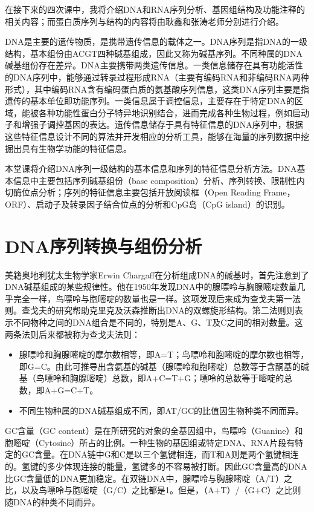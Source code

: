 在接下来的四次课中，我将介绍DNA和RNA序列分析、基因组结构及功能注释的相关内容；而蛋白质序列与结构的内容将由耿鑫和张涛老师分别进行介绍。

DNA是主要的遗传物质，是携带遗传信息的载体之一。DNA序列是指DNA的一级结构，基本组份由ACGT四种碱基组成，因此又称为碱基序列。不同种属的DNA碱基组份存在差异。DNA主要携带两类遗传信息。一类信息储存在具有功能活性的DNA序列中，能够通过转录过程形成RNA（主要有编码RNA和非编码RNA两种形式），其中编码RNA含有编码蛋白质的氨基酸序列信息，这类DNA序列主要是指遗传的基本单位即功能序列。一类信息属于调控信息，主要存在于特定DNA的区域，能被各种功能性蛋白分子特异地识别结合，进而完成各种生物过程，例如启动子和增强子调控基因的表达。遗传信息储存于具有特征信息的DNA序列中，根据这些特征信息设计不同的算法并开发相应的分析工具，能够在海量的序列数据中挖掘出具有生物学功能的特征信息。

本堂课将介绍DNA序列一级结构的基本信息和序列的特征信息分析方法。DNA基本信息中主要包括序列碱基组份（base composition）分析、序列转换、限制性内切酶位点分析；序列的特征信息主要包括开放阅读框（Open Reading Frame，ORF）、启动子及转录因子结合位点的分析和CpG岛（CpG island）的识别。

\section{DNA序列转换与组份分析}
美籍奥地利犹太生物学家Erwin Chargaff在分析组成DNA的碱基时，首先注意到了DNA碱基组成的某些规律性。他在1950年发现DNA中的腺嘌呤与胸腺嘧啶数量几乎完全一样，鸟嘌呤与胞嘧啶的数量也是一样。这项发现后来成为查戈夫第一法则。查戈夫的研究帮助克里克及沃森推断出DNA的双螺旋形结构。第二法则则表示不同物种之间的DNA组合是不同的，特别是A、G、T及C之间的相对数量。这两条法则后来都被称为查戈夫法则：
\begin{itemize}
	\item 腺嘌呤和胸腺嘧啶的摩尔数相等，即A=T；鸟嘌呤和胞嘧啶的摩尔数也相等，即G=C。由此可推导出含氨基的碱基（腺嘌呤和胞嘧啶）总数等于含酮基的碱基（鸟嘌呤和胸腺嘧啶）总数，即A+C=T+G；嘌呤的总数等于嘧啶的总数，即A+G=C+T。
	\item 不同生物种属的DNA碱基组成不同，即AT/GC的比值因生物种类不同而异。
\end{itemize}

GC含量（GC content）是在所研究的对象的全基因组中，鸟嘌呤（Guanine）和胞嘧啶（Cytosine）所占的比例。一种生物的基因组或特定DNA、RNA片段有特定的GC含量。在DNA链中G和C是以三个氢键相连，而T和A则是两个氢键相连的。氢键的多少体现连接的能量，氢键多的不容易被打断。因此GC含量高的DNA比GC含量低的DNA更加稳定。在双链DNA中，腺嘌呤与胸腺嘧啶（A/T）之比，以及鸟嘌呤与胞嘧啶（G/C）之比都是1。但是，（A+T）/（G+C）之比则随DNA的种类不同而异。

